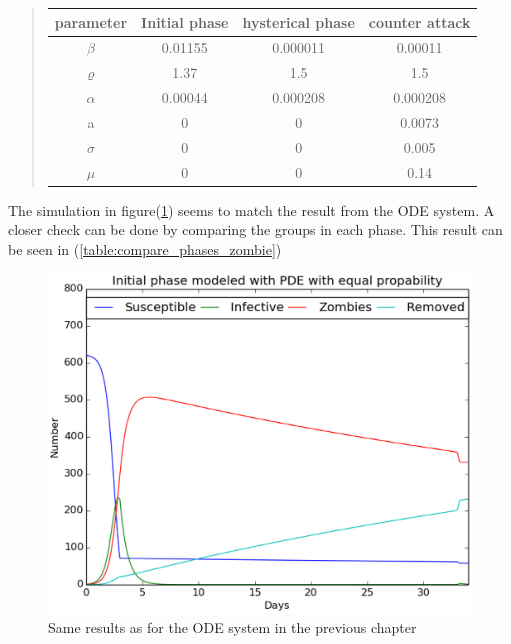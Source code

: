 \documentclass[%
twoside,                 %
final,                   %
10pt]{article}
\begin{document}
\label{table:param_val}

\begin{quote}
\begin{tabular}{cccc}
\hline
\multicolumn{1}{c}{ parameter } & \multicolumn{1}{c}{ Initial phase } & \multicolumn{1}{c}{ hysterical phase } & \multicolumn{1}{c}{ counter attack } \\
\hline
$\beta$          & 0.01155          & 0.000011         & 0.00011          \\
$\varrho$        & 1.37             & 1.5              & 1.5              \\
$\alpha$         & 0.00044          & 0.000208         & 0.000208         \\
a                & 0                & 0                & 0.0073           \\
$\sigma$         & 0                & 0                & 0.005            \\
$\mu$            & 0                & 0                & 0.14             \\
\hline
\end{tabular}
\end{quote}

\noindent
The simulation in figure(\ref{fig:zombie_three_number}) seems to match the result from the ODE system. A closer check can be done by comparing the groups in each phase. This result can be seen in (\ref{table:compare_phases_zombie}) 


\begin{figure}[ht]
  \centerline{\includegraphics[width=0.8\linewidth]{plots/2D_zombie_three_phases_number.eps}}
  \caption{
  \label{fig:zombie_three_number} Same results as for the ODE system in the previous chapter
  }
\end{figure}
\end{document}
